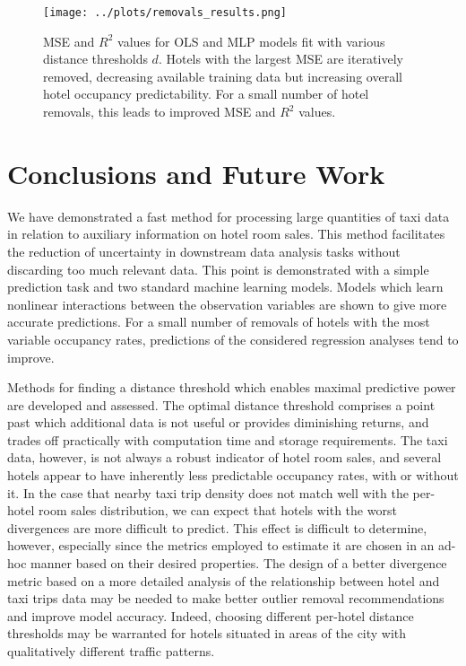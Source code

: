 \documentclass[useAMS, referee, usenatbib]{biom}
\begin{document}
\begin{figure}
	\centering
    \captionsetup{justification=centering}
	\texttt{[image: ../plots/removals\_results.png]}
	\caption{MSE and $R^2$ values for OLS and MLP models fit with various distance thresholds $d$. Hotels with the largest MSE are iteratively removed, decreasing available training data but increasing overall hotel occupancy predictability. For a small number of hotel removals, this leads to improved MSE and $R^2$ values.}
	\label{fig:removals}
\end{figure}

\section{Conclusions and Future Work}
\label{s:conclusion}

We have demonstrated a fast method for processing large quantities of taxi data in relation to auxiliary information on hotel room sales. This method facilitates the reduction of uncertainty in downstream data analysis tasks without discarding too much relevant data. This point is demonstrated with a simple prediction task and two standard machine learning models. Models which learn nonlinear interactions between the observation variables are shown to give more accurate predictions. For a small number of removals of hotels with the most variable occupancy rates, predictions of the considered regression analyses tend to improve.

Methods for finding a distance threshold which enables maximal predictive power are developed and assessed. The optimal distance threshold comprises a point past which additional data is not useful or provides diminishing returns, and trades off practically with computation time and storage requirements. The taxi data, however, is not always a robust indicator of hotel room sales, and several hotels appear to have inherently less predictable occupancy rates, with or without it. In the case that nearby taxi trip density does not match well with the per-hotel room sales distribution, we can expect that hotels with the worst divergences are more difficult to predict. This effect is difficult to determine, however, especially since the metrics employed to estimate it are chosen in an ad-hoc manner based on their desired properties. The design of a better divergence metric based on a more detailed analysis of the relationship between hotel and taxi trips data may be needed to make better outlier removal recommendations and improve model accuracy. Indeed, choosing different per-hotel distance thresholds may be warranted for hotels situated in areas of the city with qualitatively different traffic patterns.
\end{document}
